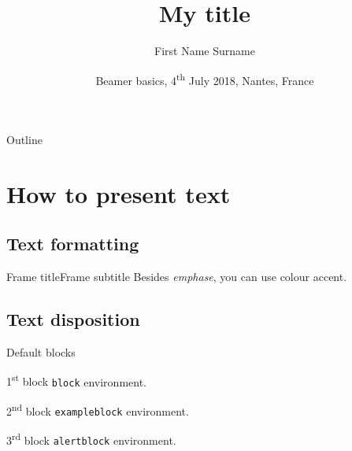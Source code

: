 \documentclass{beamer}
\title[My short title]{My title}
\author[F.\,N. Surname ]{First Name Surname}
\institute[Short affiliation]{My affiliation}
\date[2018-07-04]{Beamer basics, 4\textsuperscript{th} July 2018, Nantes, France}
\begin{document}
\maketitle{}

\begin{frame}{Outline}
  \tableofcontents{}
\end{frame}

\section{How to present text}

\subsection{Text formatting}

\begin{frame}{Frame title}{Frame subtitle}
  Besides \emph{emphase}, you can use colour \alert{accent}.
\end{frame}

\subsection{Text disposition}

\begin{frame}{Default blocks}
  
  \begin{block}{1\textsuperscript{st} block}
    \texttt{block} environment.
  \end{block}
  
  \begin{exampleblock}{2\textsuperscript{nd} block}
    \texttt{exampleblock} environment.
  \end{exampleblock}
  
  \begin{alertblock}{3\textsuperscript{rd} block}
    \texttt{alertblock} environment.
  \end{alertblock}
  
\end{frame}
\end{document}

